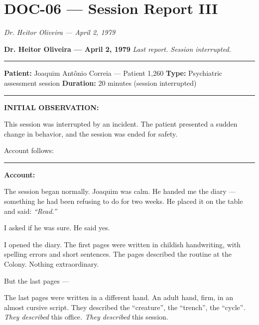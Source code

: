 \section*{\textbf{DOC-06} --- Session Report III}

\noindent \textit{Dr. Heitor Oliveira --- April 2, 1979}

\noindent \textbf{Dr. Heitor Oliveira --- April 2, 1979}
\textit{Last report. Session interrupted.}

\vspace{0.5em}\noindent\rule{\textwidth}{0.5pt}\vspace{0.5em}

\noindent \textbf{Patient:} Joaquim Antônio Correia --- Patient 1,260
\textbf{Type:} Psychiatric assessment session
\textbf{Duration:} 20 minutes (session interrupted)

\vspace{0.5em}\noindent\rule{\textwidth}{0.5pt}\vspace{0.5em}

\noindent \textbf{INITIAL OBSERVATION:}

\noindent This session was interrupted by an incident. The patient presented a sudden change in behavior, and the session was ended for safety.

\noindent Account follows:

\vspace{0.5em}\noindent\rule{\textwidth}{0.5pt}\vspace{0.5em}

\noindent \textbf{Account:}

\noindent The session began normally. Joaquim was calm. He handed me the diary --- something he had been refusing to do for two weeks. He placed it on the table and said: \textit{\textquotedblleft{}Read.\textquotedblright{}}

\noindent I asked if he was sure. He said yes.

\noindent I opened the diary. The first pages were written in childish handwriting, with spelling errors and short sentences. The pages described the routine at the Colony. Nothing extraordinary.

\noindent But the last pages ---

\noindent The last pages were written in a different hand. An adult hand, firm, in an almost cursive script. They described the \textquotedblleft{}creature\textquotedblright{}, the \textquotedblleft{}trench\textquotedblright{}, the \textquotedblleft{}cycle\textquotedblright{\textit{. They described }this office\textit{. They described }this session}.

